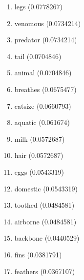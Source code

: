 \begin{enumerate}
\item legs (0.0778267)
\item venomous (0.0734214)
\item predator (0.0734214)
\item tail (0.0704846)
\item animal (0.0704846)
\item breathes (0.0675477)
\item catsize (0.0660793)
\item aquatic (0.061674)
\item milk (0.0572687)
\item hair (0.0572687)
\item eggs (0.0543319)
\item domestic (0.0543319)
\item toothed (0.0484581)
\item airborne (0.0484581)
\item backbone (0.0440529)
\item fins (0.0381791)
\item feathers (0.0367107)
\end{enumerate}